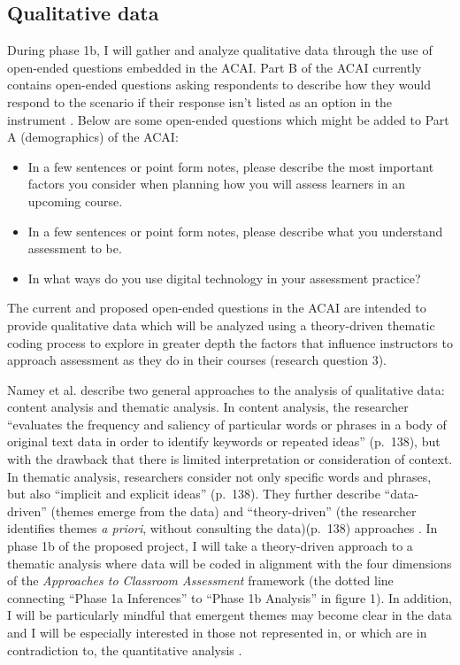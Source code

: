 \documentclass[
]{book}
\providecommand{\tightlist}{%
  \setlength{\itemsep}{0pt}\setlength{\parskip}{0pt}}
\begin{document}
\hypertarget{qualitative-data}{%
\subsection{Qualitative data}\label{qualitative-data}}

During phase 1b, I will gather and analyze qualitative data through the use of open-ended questions embedded in the ACAI. Part B of the ACAI currently contains open-ended questions asking respondents to describe how they would respond to the scenario if their response isn't listed as an option in the instrument \citep{delucaACAIInstrumentSpecificationsND}. Below are some open-ended questions which might be added to Part A (demographics) of the ACAI:

\begin{itemize}
\tightlist
\item
  In a few sentences or point form notes, please describe the most important factors you consider when planning how you will assess learners in an upcoming course.
\item
  In a few sentences or point form notes, please describe what you understand assessment to be.
\item
  In what ways do you use digital technology in your assessment practice?
\end{itemize}

The current and proposed open-ended questions in the ACAI are intended to provide qualitative data which will be analyzed using a theory-driven thematic coding process \citep{delucaStudentPerspectivesAssessment2018, nameyDataReductionTechniques2008} to explore in greater depth the factors that influence instructors to approach assessment as they do in their courses (research question 3).

Namey et al. \citeyearpar{nameyDataReductionTechniques2008} describe two general approaches to the analysis of qualitative data: content analysis and thematic analysis. In content analysis, the researcher ``evaluates the frequency and saliency of particular words or phrases in a body of original text data in order to identify keywords or repeated ideas'' (p.~138), but with the drawback that there is limited interpretation or consideration of context. In thematic analysis, researchers consider not only specific words and phrases, but also ``implicit and explicit ideas'' (p.~138). They further describe ``data-driven'' (themes emerge from the data) and ``theory-driven'' (the researcher identifies themes \emph{a priori}, without consulting the data)(p.~138) approaches \citep[see also:][]{tashakkoriFoundationsMixedMethods2020}. In phase 1b of the proposed project, I will take a theory-driven approach to a thematic analysis where data will be coded in alignment with the four dimensions of the \emph{Approaches to Classroom Assessment} framework \citep{delucaTeachersApproachesClassroom2016} (the dotted line connecting ``Phase 1a Inferences'' to ``Phase 1b Analysis'' in figure 1). In addition, I will be particularly mindful that emergent themes may become clear in the data and I will be especially interested in those not represented in, or which are in contradiction to, the quantitative analysis \citep{tashakkoriFoundationsMixedMethods2020}.
\end{document}
